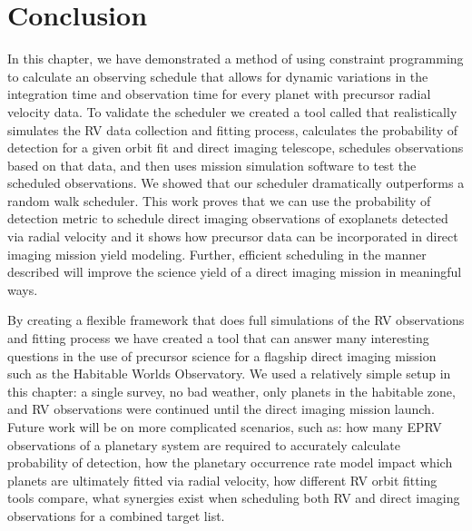 \section{Conclusion}

In this chapter, we have demonstrated a method of using constraint programming
to calculate an observing schedule that allows for dynamic variations in the
integration time and observation time for every planet with precursor radial
velocity data. To validate the scheduler we created a tool called
 that realistically simulates the RV data collection and
fitting process, calculates the probability of detection for a given orbit fit
and direct imaging telescope, schedules observations based on that data, and
then uses mission simulation software to test the scheduled observations. We
showed that our scheduler dramatically outperforms a random walk scheduler.
This work proves that we can use the probability of detection metric to
schedule direct imaging observations of exoplanets detected via radial velocity
and it shows how precursor data can be incorporated in direct imaging mission
yield modeling. Further, efficient scheduling in the manner described will
improve the science yield of a direct imaging mission in meaningful ways.

By creating a flexible framework that does full simulations of the RV
observations and fitting process we have created a tool that can answer many
interesting questions in the use of precursor science for a flagship direct
imaging mission such as the Habitable Worlds Observatory. We used a relatively
simple setup in this chapter: a single survey, no bad weather, only
planets in the habitable zone, and RV observations were continued until the
direct imaging mission launch. Future work will be on more complicated
scenarios, such as: how many EPRV observations of a planetary system are
required to accurately calculate probability of detection, how the
planetary occurrence rate model impact which planets are ultimately fitted via
radial velocity, how different RV orbit fitting tools compare, what
synergies exist when scheduling both RV and direct imaging observations for a
combined target list.

